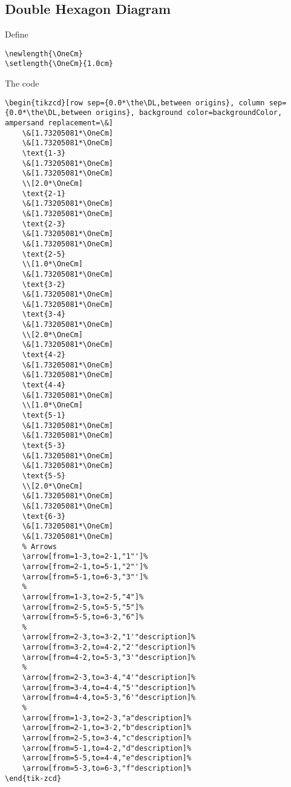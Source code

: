 \subsection{Double Hexagon Diagram}\label{subsection-tikz-code-for-commutative-diagrams-double-hexagon-diagram}
Define
\begin{verbatim}
\newlength{\OneCm}
\setlength{\OneCm}{1.0cm}
\end{verbatim}
The code
\begin{verbatim}
\begin{tikzcd}[row sep={0.0*\the\DL,between origins}, column sep={0.0*\the\DL,between origins}, background color=backgroundColor, ampersand replacement=\&]
    \&[1.73205081*\OneCm]
    \&[1.73205081*\OneCm]
    \text{1-3}
    \&[1.73205081*\OneCm]
    \&[1.73205081*\OneCm]
    \\[2.0*\OneCm]
    \text{2-1}
    \&[1.73205081*\OneCm]
    \&[1.73205081*\OneCm]
    \text{2-3}
    \&[1.73205081*\OneCm]
    \&[1.73205081*\OneCm]
    \text{2-5}
    \\[1.0*\OneCm]
    \&[1.73205081*\OneCm]
    \text{3-2}
    \&[1.73205081*\OneCm]
    \&[1.73205081*\OneCm]
    \text{3-4}
    \&[1.73205081*\OneCm]
    \\[2.0*\OneCm]
    \&[1.73205081*\OneCm]
    \text{4-2}
    \&[1.73205081*\OneCm]
    \&[1.73205081*\OneCm]
    \text{4-4}
    \&[1.73205081*\OneCm]
    \\[1.0*\OneCm]
    \text{5-1}
    \&[1.73205081*\OneCm]
    \&[1.73205081*\OneCm]
    \text{5-3}
    \&[1.73205081*\OneCm]
    \&[1.73205081*\OneCm]
    \text{5-5}
    \\[2.0*\OneCm]
    \&[1.73205081*\OneCm]
    \&[1.73205081*\OneCm]
    \text{6-3}
    \&[1.73205081*\OneCm]
    \&[1.73205081*\OneCm]
    % Arrows
    \arrow[from=1-3,to=2-1,"1"']%
    \arrow[from=2-1,to=5-1,"2"']%
    \arrow[from=5-1,to=6-3,"3"']%
    %
    \arrow[from=1-3,to=2-5,"4"]%
    \arrow[from=2-5,to=5-5,"5"]%
    \arrow[from=5-5,to=6-3,"6"]%
    %
    \arrow[from=2-3,to=3-2,"1'"description]%
    \arrow[from=3-2,to=4-2,"2'"description]%
    \arrow[from=4-2,to=5-3,"3'"description]%
    %
    \arrow[from=2-3,to=3-4,"4'"description]%
    \arrow[from=3-4,to=4-4,"5'"description]%
    \arrow[from=4-4,to=5-3,"6'"description]%
    %
    \arrow[from=1-3,to=2-3,"a"description]%
    \arrow[from=2-1,to=3-2,"b"description]%
    \arrow[from=2-5,to=3-4,"c"description]%
    \arrow[from=5-1,to=4-2,"d"description]%
    \arrow[from=5-5,to=4-4,"e"description]%
    \arrow[from=5-3,to=6-3,"f"description]%
\end{tik-zcd}
\end{verbatim}
